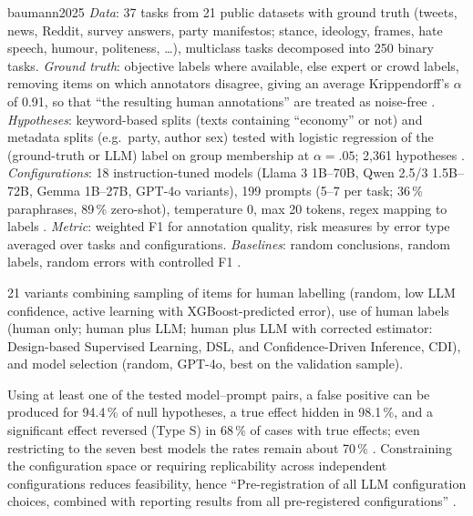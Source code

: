 \begin{papercard}{baumann2025}
 \emph{Data}: 37 tasks from 21 public datasets with ground truth (tweets, news, Reddit, survey answers, party manifestos; stance, ideology, frames, hate speech, humour, politeness, \ldots), multiclass tasks decomposed into 250 binary tasks. \emph{Ground truth}: objective labels where available, else expert or crowd labels, removing items on which annotators disagree, giving an average Krippendorff's $\alpha$ of 0.91, so that ``the resulting human annotations'' are treated as noise-free . \emph{Hypotheses}: keyword-based splits (texts containing ``economy'' or not) and metadata splits (e.g.\ party, author sex) tested with logistic regression of the (ground-truth or LLM) label on group membership at $\alpha=.05$; 2,361 hypotheses . \emph{Configurations}: 18 instruction-tuned models (Llama 3 1B--70B, Qwen 2.5/3 1.5B--72B, Gemma 1B--27B, GPT-4o variants), 199 prompts (5--7 per task; 36\,\% paraphrases, 89\,\% zero-shot), temperature 0, max 20 tokens, regex mapping to labels . \emph{Metric}: weighted F1 for annotation quality, risk measures by error type averaged over tasks and configurations. \emph{Baselines}: random conclusions, random labels, random errors with controlled F1 .

 21 variants combining sampling of items for human labelling (random, low LLM confidence, active learning with XGBoost-predicted error), use of human labels (human only; human plus LLM; human plus LLM with corrected estimator: Design-based Supervised Learning, DSL, and Confidence-Driven Inference, CDI), and model selection (random, GPT-4o, best on the validation sample).

 Using at least one of the tested model--prompt pairs, a false positive can be produced for 94.4\,\% of null hypotheses, a true effect hidden in 98.1\,\%, and a significant effect reversed (Type S) in 68\,\% of cases with true effects; even restricting to the seven best models the rates remain about 70\,\% . Constraining the configuration space or requiring replicability across independent configurations reduces feasibility, hence ``Pre-registration of all LLM configuration choices, combined with reporting results from all pre-registered configurations'' .


\end{papercard}

